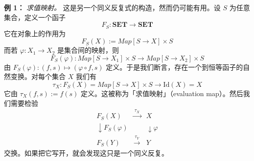 \textbf{例 1：} \textit{求值映射。} 这是另一个同义反复式的构造，然而仍可能有用。设 $S$ 为任意集合，定义一个函子
\begin{equation}
F_S:\textbf{SET}\to\textbf{SET}
\tag{K.25}
\label{eq:K.25}
\end{equation}
它在对象上的作用为
\begin{equation}
F_S(X):=\mathit{Map}[S\to X]\times S
\tag{K.26}
\label{eq:K.26}
\end{equation}
而若 $\varphi:X_1\to X_2$ 是集合间的映射，则
\begin{equation}
F_S(\varphi):\mathit{Map}[S\to X_1]\times S\to\mathit{Map}[S\to X_2]\times S
\tag{K.27}
\label{eq:K.27}
\end{equation}
由 $F_S(\varphi):(f,s)\mapsto(\varphi\circ f,s)$ 定义。于是我们断言，存在一个到恒等函子的自然变换。对每个集合 $X$ 我们有
\begin{equation}
\tau_X:F_S(X)=\mathit{Map}[S\to X]\times S\to\mathrm{Id}(X)=X
\tag{K.28}
\label{eq:K.28}
\end{equation}
它由 $\tau_X(f,s):=f(s)$ 定义。这被称为「求值映射」（evaluation map）。然后我们需要检验
\begin{equation}
\begin{array}{ccc}
F_S(X) & \xrightarrow{\ \tau_X\ } & X\\[2pt]
\downarrow\scriptstyle{F_S(\varphi)} & & \downarrow\scriptstyle{\varphi}\\[2pt]
F_S(Y) & \xrightarrow{\ \tau_Y\ } & Y
\end{array}
\tag{K.29}
\label{eq:K.29}
\end{equation}
交换。如果把它写开，就会发现这只是一个同义反复。


